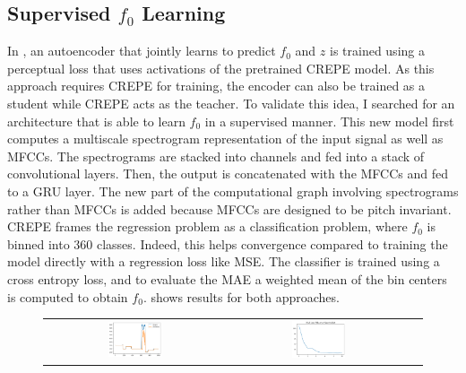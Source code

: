 \begin{theappendices}
\section{Supervised $f_0$ Learning}
\label{supervised-pitch}
In \citet{ddsp}, an autoencoder that jointly learns to predict $f_0$ and $z$ is trained using a perceptual loss that uses activations of the pretrained CREPE model.
As this approach requires CREPE for training, the encoder can also be trained as a student while CREPE acts as the teacher. \newline
To validate this idea, I searched for an architecture that is able to learn $f_0$ in a supervised manner.
This new model first computes a multiscale spectrogram representation of the input signal as well as MFCCs. The spectrograms are stacked into channels and fed into a stack of convolutional layers. Then, the output is concatenated with the MFCCs and fed to a GRU layer.
The new part of the computational graph involving spectrograms rather than MFCCs is added because MFCCs are designed to be pitch invariant. \newline
CREPE frames the regression problem as a classification problem, where $f_0$ is binned into 360 classes. Indeed, this helps convergence compared to training the model directly with a regression loss like MSE. The classifier is trained using a cross entropy loss, and to evaluate the MAE a weighted mean of the bin centers is computed to obtain $f_0$.
 shows results for both approaches.

\begin{figure}
    \centering
    \begin{tabular}{ccc}
        \includegraphics[width=0.31\textwidth]{figures/pitch_learning/supervised/f0_classification_result.png} &
        
        \includegraphics[width=0.31\textwidth]{figures/pitch_learning/supervised/f0_classification_convergence.png}  &
        

\end{tabular}
\end{figure}
\end{theappendices}
